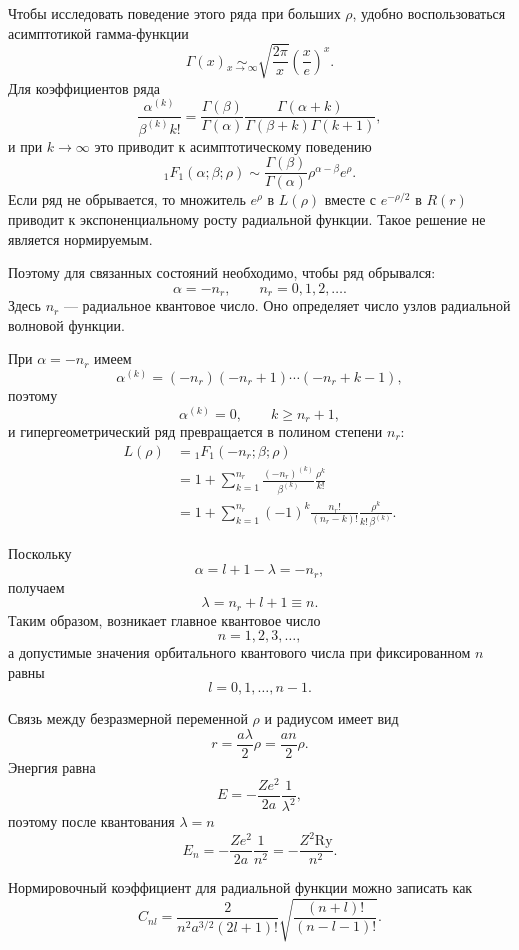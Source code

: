 \documentclass[12pt,a4paper]{article}
\begin{document}
Чтобы исследовать поведение этого ряда при больших $\rho$, удобно
воспользоваться асимптотикой гамма-функции
\[
    \Gamma(x)
    \underset{x\to\infty}{\sim}
    \sqrt{\frac{2\pi}{x}}
    \left(\frac{x}{e}\right)^x.
\]
Для коэффициентов ряда
\[
    \frac{\alpha^{(k)}}{\beta^{(k)}k!}
    =
    \frac{\Gamma(\beta)}{\Gamma(\alpha)}
    \frac{\Gamma(\alpha+k)}
         {\Gamma(\beta+k)\Gamma(k+1)},
\]
и при $k\to\infty$ это приводит к асимптотическому поведению
\[
    {}_1F_1(\alpha;\beta;\rho)
    \sim
    \frac{\Gamma(\beta)}{\Gamma(\alpha)}
    \rho^{\alpha-\beta}e^\rho.
\]
Если ряд не обрывается, то множитель $e^\rho$ в $L(\rho)$ вместе с
$e^{-\rho/2}$ в $R(r)$ приводит к экспоненциальному росту радиальной
функции. Такое решение не является нормируемым.

Поэтому для связанных состояний необходимо, чтобы ряд обрывался:
\[
    \boxed{
        \alpha=-n_r,
        \qquad
        n_r=0,1,2,\ldots
    }.
\]
Здесь $n_r$ --- радиальное квантовое число. Оно определяет число узлов
радиальной волновой функции.

При $\alpha=-n_r$ имеем
\[
    \alpha^{(k)}
    =
    (-n_r)(-n_r+1)\cdots(-n_r+k-1),
\]
поэтому
\[
    \alpha^{(k)}=0,
    \qquad
    k\geq n_r+1,
\]
и гипергеометрический ряд превращается в полином степени $n_r$:
\[
\begin{aligned}
    L(\rho)
    &=
    {}_1F_1(-n_r;\beta;\rho) \\
    &=
    1+
    \sum_{k=1}^{n_r}
    \frac{(-n_r)^{(k)}}{\beta^{(k)}}
    \frac{\rho^k}{k!} \\
    &=
    1+
    \sum_{k=1}^{n_r}
    (-1)^k
    \frac{n_r!}{(n_r-k)!}
    \frac{\rho^k}{k!\,\beta^{(k)}}.
\end{aligned}
\]

Поскольку
\[
    \alpha=l+1-\lambda=-n_r,
\]
получаем
\[
    \boxed{
        \lambda=n_r+l+1\equiv n
    }.
\]
Таким образом, возникает главное квантовое число
\[
    \boxed{
        n=1,2,3,\ldots
    },
\]
а допустимые значения орбитального квантового числа при фиксированном
$n$ равны
\[
    \boxed{
        l=0,1,\ldots,n-1
    }.
\]

Связь между безразмерной переменной $\rho$ и радиусом имеет вид
\[
    r=\frac{a\lambda}{2}\rho
    =
    \frac{an}{2}\rho.
\]
Энергия равна
\[
    E
    =
    -\frac{Ze^2}{2a}\frac{1}{\lambda^2},
\]
поэтому после квантования $\lambda=n$
\[
    \boxed{
        E_n
        =
        -\frac{Ze^2}{2a}\frac{1}{n^2}
        =
        -\frac{Z^2\mathrm{Ry}}{n^2}
    }.
\]

Нормировочный коэффициент для радиальной функции можно записать как
\[
    \boxed{
    C_{nl}
    =
    \frac{2}
         {n^2a^{3/2}(2l+1)!}
    \sqrt{
        \frac{(n+l)!}{(n-l-1)!}
    }
    }.
\]
\end{document}
